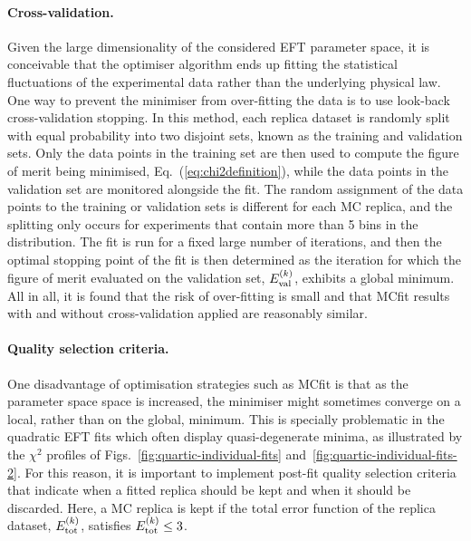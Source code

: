 \paragraph{Cross-validation.}
%
Given the large dimensionality of the considered EFT parameter space, it is conceivable
that the optimiser algorithm ends up fitting the statistical fluctuations 
of the experimental data rather than the underlying physical law.
%
One way to prevent the minimiser from over-fitting the data is to use
look-back cross-validation stopping.
%
In this method, each replica dataset is randomly split with equal probability into two 
disjoint sets, known as the training and validation sets.
%
Only the data points in the training set are then used to compute the figure of 
merit being minimised, Eq.~(\ref{eq:chi2definition}), while the data points in 
the validation set are monitored alongside the fit.
%
The random assignment of the data points to the training or validation sets
is different for each MC replica, and the splitting only occurs for experiments
that contain more than 5 bins in the distribution. 
%
The fit is run for a fixed large number of iterations, and then
the optimal stopping point of 
the fit is then determined as the iteration for which the figure of merit evaluated on the validation set, 
$E^{(k)}_{\rm val}$, exhibits a global minimum.
%
All in all, it is found that the risk of over-fitting is small and that
MCfit results with and without cross-validation applied are reasonably similar.

\paragraph{Quality selection criteria.}
%
One disadvantage of optimisation strategies such as MCfit is that as the parameter space
space is increased, the minimiser might sometimes converge on a local,
rather than on the global, minimum.
%
This is specially problematic in the quadratic EFT fits which often display
quasi-degenerate minima, as illustrated by the $\chi^2$ profiles of
Figs.~\ref{fig:quartic-individual-fits} 
and~\ref{fig:quartic-individual-fits-2}.
%
For this reason, it is important to implement post-fit quality selection criteria
that indicate when a fitted replica should be kept and when it should be discarded.
%
Here, a MC
replica is kept if the total error function of the replica dataset, $E_{\rm tot}^{(k)}$, satisfies
$E_{\rm tot}^{(k)}\le 3$.

